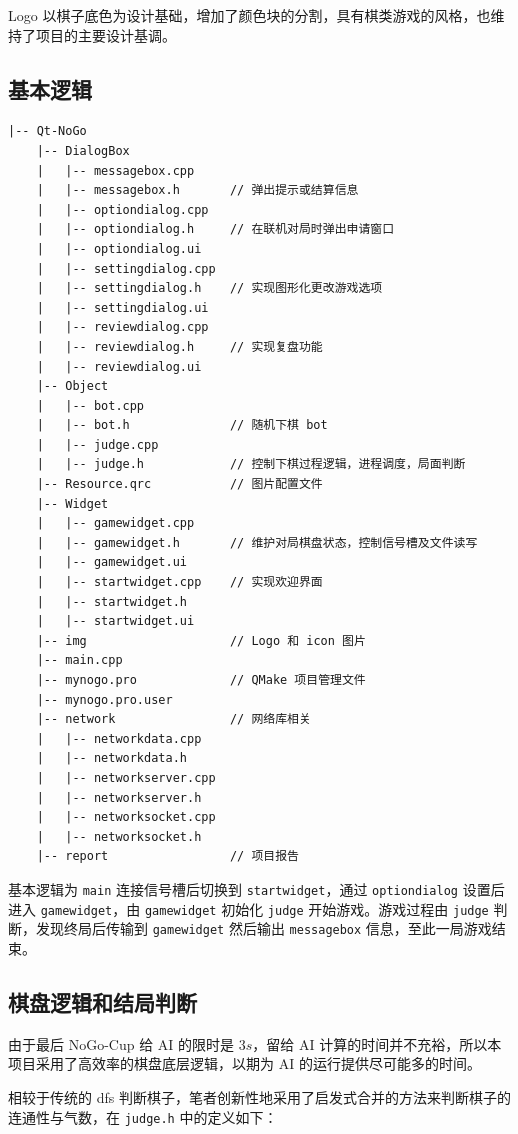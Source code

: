 \documentclass{noithesis}
\begin{document}
	Logo 以棋子底色为设计基础，增加了颜色块的分割，具有棋类游戏的风格，也维持了项目的主要设计基调。

	\subsection{基本逻辑}
	
    \begin{verbatim}
|-- Qt-NoGo
    |-- DialogBox
    |   |-- messagebox.cpp
    |   |-- messagebox.h       // 弹出提示或结算信息
    |   |-- optiondialog.cpp
    |   |-- optiondialog.h     // 在联机对局时弹出申请窗口
    |   |-- optiondialog.ui
    |   |-- settingdialog.cpp
    |   |-- settingdialog.h    // 实现图形化更改游戏选项
    |   |-- settingdialog.ui
    |   |-- reviewdialog.cpp
    |   |-- reviewdialog.h     // 实现复盘功能
    |   |-- reviewdialog.ui
    |-- Object
    |   |-- bot.cpp
    |   |-- bot.h              // 随机下棋 bot
    |   |-- judge.cpp
    |   |-- judge.h            // 控制下棋过程逻辑，进程调度，局面判断
    |-- Resource.qrc           // 图片配置文件
    |-- Widget
    |   |-- gamewidget.cpp
    |   |-- gamewidget.h       // 维护对局棋盘状态，控制信号槽及文件读写
    |   |-- gamewidget.ui
    |   |-- startwidget.cpp    // 实现欢迎界面
    |   |-- startwidget.h
    |   |-- startwidget.ui
    |-- img                    // Logo 和 icon 图片
    |-- main.cpp
    |-- mynogo.pro             // QMake 项目管理文件
    |-- mynogo.pro.user
    |-- network                // 网络库相关
    |   |-- networkdata.cpp
    |   |-- networkdata.h
    |   |-- networkserver.cpp
    |   |-- networkserver.h
    |   |-- networksocket.cpp
    |   |-- networksocket.h
    |-- report                 // 项目报告
	\end{verbatim}

	基本逻辑为 \verb|main| 连接信号槽后切换到 \verb|startwidget|，通过 \verb|optiondialog| 设置后进入 \verb|gamewidget|，由 \verb|gamewidget| 初始化 \verb|judge| 开始游戏。游戏过程由 \verb|judge| 判断，发现终局后传输到 \verb|gamewidget| 然后输出 \verb|messagebox| 信息，至此一局游戏结束。

	\subsection{棋盘逻辑和结局判断}
	
	由于最后 NoGo-Cup 给 AI 的限时是 $3s$，留给 AI 计算的时间并不充裕，所以本项目采用了高效率的棋盘底层逻辑，以期为 AI 的运行提供尽可能多的时间。
	
	相较于传统的 dfs 判断棋子，笔者创新性地采用了启发式合并的方法来判断棋子的连通性与气数，在 \verb|judge.h| 中的定义如下：
	
\end{document}

